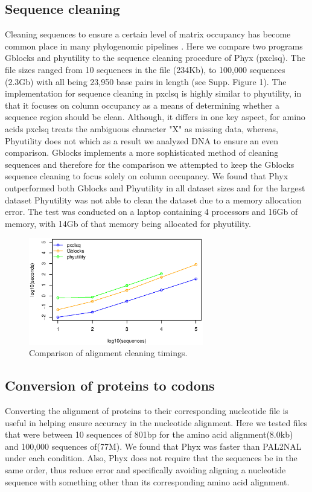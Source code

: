 \documentclass{article}
\begin{document}
\subsection{Sequence cleaning}
Cleaning sequences to ensure a certain level of matrix occupancy has become common place in many phylogenomic pipelines \citep{Dunn2013,YangSmith2014}. Here we compare two programs Gblocks \citep{Gblocks} and phyutility \citep{SmithDunn2008} to the sequence cleaning procedure of Phyx (pxclsq). The file sizes ranged from 10 sequences in the file (234Kb), to 100,000 sequences (2.3Gb) with all being 23,950 base pairs in length (see Supp. Figure 1). The implementation for sequence cleaning in pxclsq is highly similar to phyutility, in that it focuses on column occupancy as a means of determining whether a sequence region should be clean. Although, it differs in one key aspect, for amino acids pxclsq treats the ambiguous character "X" as missing data, whereas, Phyutility does not which as a result we analyzed DNA to ensure an even comparison. Gblocks implements a more sophisticated method of cleaning sequences and therefore for the comparison we attempted to keep the Gblocks sequence cleaning to focus solely on column occupancy. We found that Phyx outperformed both Gblocks and Phyutility in all dataset sizes and for the largest dataset Phyutility was not able to clean the dataset due to a memory allocation error. The test was conducted on a laptop  containing 4 processors and 16Gb of memory, with 14Gb of that memory being allocated for phyutility.

\begin{figure}[H]
    \centering
    \includegraphics[width=3.0in]{clsq.eps}
    \caption{Comparison of alignment cleaning timings.}
    \label{cleaningfigure}
\label{fig:S1}
\end{figure}

\subsection{Conversion of proteins to codons}
Converting the alignment of proteins to their corresponding nucleotide file is useful in helping ensure accuracy in the nucleotide alignment. Here we tested files that were between 10 sequences of 801bp for the amino acid alignment(8.0kb) and 100,000 sequences of(77M). We found that Phyx was faster than PAL2NAL\cite{Suyama2006} under each condition. Also, Phyx does not require that the sequences be in the same order, thus reduce error and specifically avoiding aligning a nucleotide sequence with something other than its corresponding amino acid alignment.
\end{document}
